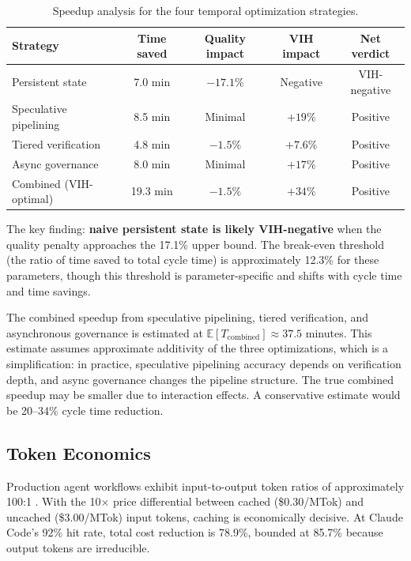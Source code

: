 \documentclass[11pt, a4paper, logo, copyright]{googledeepmind}
\newcommand{\E}{\mathbb{E}}
\begin{document}
\begin{table}[ht]
\centering
\caption{Speedup analysis for the four temporal optimization strategies.}\label{tab:speedup}
\begin{tabular}{lcccc}
\toprule
Strategy & Time saved & Quality impact & VIH impact & Net verdict \\
\midrule
Persistent state & 7.0 min & $-17.1\%$ & Negative & VIH-negative \\
Speculative pipelining & 8.5 min & Minimal & $+19\%$ & Positive \\
Tiered verification & 4.8 min & $-1.5\%$ & $+7.6\%$ & Positive \\
Async governance & 8.0 min & Minimal & $+17\%$ & Positive \\
\midrule
Combined (VIH-optimal) & 19.3 min & $-1.5\%$ & $+34\%$ & Positive \\
\bottomrule
\end{tabular}
\end{table}

The key finding: \textbf{naive persistent state is likely VIH-negative} when the quality penalty approaches the 17.1\% upper bound. The break-even threshold (the ratio of time saved to total cycle time) is approximately 12.3\% for these parameters, though this threshold is parameter-specific and shifts with cycle time and time savings.

The combined speedup from speculative pipelining, tiered verification, and asynchronous governance is estimated at $\E[T_{\mathrm{combined}}] \approx 37.5$ minutes. This estimate assumes approximate additivity of the three optimizations, which is a simplification: in practice, speculative pipelining accuracy depends on verification depth, and async governance changes the pipeline structure. The true combined speedup may be smaller due to interaction effects. A conservative estimate would be 20--34\% cycle time reduction.

\subsection{Token Economics}

Production agent workflows exhibit input-to-output token ratios of approximately 100:1 \citep{manus2025context}. With the 10$\times$ price differential between cached (\$0.30/MTok) and uncached (\$3.00/MTok) input tokens, caching is economically decisive. At Claude Code's 92\% hit rate, total cost reduction is 78.9\%, bounded at 85.7\% because output tokens are irreducible.
\end{document}
